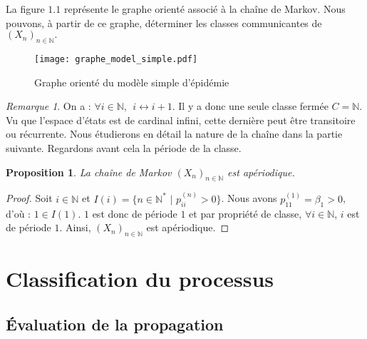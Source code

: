 \documentclass[12pt,a4paper]{report}
\newtheorem{prop}[thm]{Proposition}
\theoremstyle{remark}
\newtheorem*{remark}{Remarque}
\begin{document}
La figure $1.1$ représente le graphe orienté associé à la chaîne de Markov. Nous pouvons, à partir de ce graphe, déterminer les classes communicantes de $(X_n)_{n \in \mathbb{N}}.$

\begin{figure}[h]
    \centering
    \texttt{[image: graphe\_model\_simple.pdf]} 
    \caption{Graphe orienté du modèle simple d'épidémie}
    \label{fig:my_label}
\end{figure}

\begin{remark}
On a : $\forall i \in \mathbb{N},\ \  i \longleftrightarrow i+1$.
Il y a donc une seule classe fermée $C=\mathbb{N}$. Vu que l'espace d'états est de cardinal infini, cette dernière peut être transitoire ou récurrente. Nous étudierons en détail la nature de la chaîne dans la partie suivante. Regardons avant cela la période de la classe.
\end{remark}

\begin{prop}\label{aperiodique}
La chaîne de Markov $(X_n)_{n \in \mathbb{N}}$ est apériodique.
\end{prop}
\begin{proof}
Soit $i \in \mathbb{N}$ et $I(i) = \{n \in \mathbb{N}^* \, \, | \, \,p_{ii}^{(n)} > 0\}$. Nous avons $p_{11}^{(1)} = \beta_1 > 0$, d'où : $1 \in I(1)$. $1$ est donc de période $1$ et par propriété de classe, $\forall i \in \mathbb{N}$, $i$ est de période $1$. Ainsi, $(X_n)_{n \in \mathbb{N}}$ est apériodique.
\end{proof}

\section{Classification du processus}

\subsection{Évaluation de la propagation}
\vspace{0.6cm}
\end{document}
